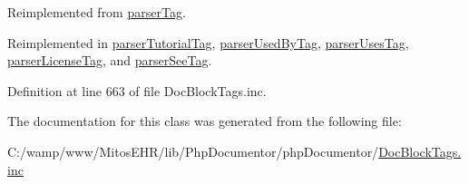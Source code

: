 \-Reimplemented from \hyperlink{classparser_tag_a4a925d6b38bcf3957c713a7d3dc7da1f}{parser\-Tag}.



\-Reimplemented in \hyperlink{classparser_tutorial_tag_a4a925d6b38bcf3957c713a7d3dc7da1f}{parser\-Tutorial\-Tag}, \hyperlink{classparser_used_by_tag_a4a925d6b38bcf3957c713a7d3dc7da1f}{parser\-Used\-By\-Tag}, \hyperlink{classparser_uses_tag_a4a925d6b38bcf3957c713a7d3dc7da1f}{parser\-Uses\-Tag}, \hyperlink{classparser_license_tag_a4a925d6b38bcf3957c713a7d3dc7da1f}{parser\-License\-Tag}, and \hyperlink{classparser_see_tag_a4a925d6b38bcf3957c713a7d3dc7da1f}{parser\-See\-Tag}.



\-Definition at line 663 of file \-Doc\-Block\-Tags.\-inc.



\-The documentation for this class was generated from the following file\-:\begin{DoxyCompactItemize}
\item 
\-C\-:/wamp/www/\-Mitos\-E\-H\-R/lib/\-Php\-Documentor/php\-Documentor/\hyperlink{_doc_block_tags_8inc}{\-Doc\-Block\-Tags.\-inc}\end{DoxyCompactItemize}
